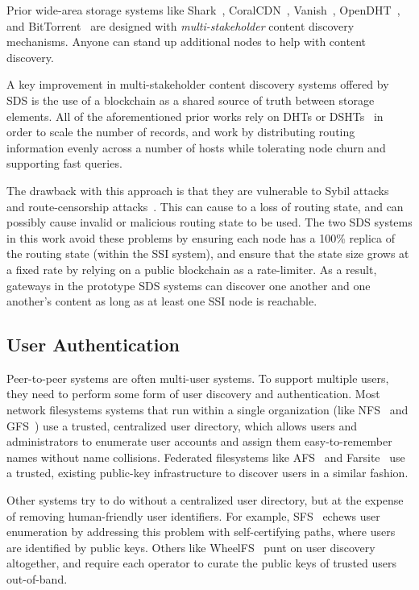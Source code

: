 Prior wide-area storage systems like Shark~\cite{shark}, CoralCDN~\cite{coral}, Vanish~\cite{vanish},
OpenDHT~\cite{opendht}, and BitTorrent~\cite{bittorrent} are designed with
\emph{multi-stakeholder} content discovery mechanisms.  Anyone can stand up additional
nodes to help with content discovery.

A key improvement in multi-stakeholder content discovery systems offered by SDS
is the use of a blockchain as a shared source of truth between storage elements.
All of the aforementioned prior works rely on DHTs or DSHTs~\cite{dsht} in order to
scale the number of records, and work by distributing routing information
evenly across a number of hosts while tolerating node churn and supporting
fast queries.

The drawback with this approach is that they are vulnerable to Sybil
attacks~\cite{sybil-attack} and route-censorship
attacks~\cite{dht-route-censorship}.  This can cause to a loss of routing state,
and can possibly cause invalid or malicious routing state to be used.
The two SDS systems in this work avoid these problems by ensuring each node has a 100\% replica of the
routing state (within the SSI system), and ensure that the state size grows at a fixed rate by relying
on a public blockchain as a rate-limiter.  As a result, gateways in the
prototype SDS systems can discover one another and one another's content as long
as at least one SSI node is reachable.

\subsection{User Authentication}

Peer-to-peer systems are often multi-user systems.  To support multiple users,
they need to perform some form of user discovery and authentication.
Most network filesystems systems that run within a single organization (like
NFS~\cite{nfs} and GFS~\cite{gfs}) use a trusted, centralized user directory,
which allows users and administrators to enumerate user accounts and assign them
easy-to-remember names without name collisions.
Federated filesystems like AFS~\cite{afs} and Farsite~\cite{farsite} use a
trusted, existing public-key infrastructure to discover users in a similar
fashion.

Other systems try to do without a centralized user directory, but at the expense
of removing human-friendly user identifiers.  For example,
SFS~\cite{sfs} echews user enumeration by addressing this problem with
self-certifying paths, where users are identified by public keys.
Others like WheelFS~\cite{wheelfs} punt on user discovery altogether, and
require each operator to curate the public keys of trusted users out-of-band.

